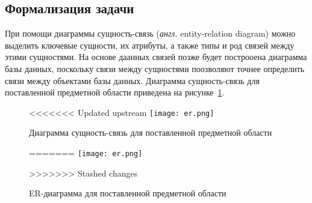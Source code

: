 \subsection{Формализация задачи}

При помощи диаграммы сущность-связь (\textit{англ.} entity-relation diagram) можно выделить ключевые сущности, их атрибуты, а также типы и род связей между этими сущностями.
На основе даанных связей позже будет построоена диаграмма базы данных, поскольку связи между сущностями поозволяют точнее определить связи между объектами базы данных.
Диаграмма сущность-связь для поставленной предметной области приведена на рисунке~\ref{fig:er}.

\begin{figure}[h!]
	\centering
	\captionsetup{justification=centering}
<<<<<<< Updated upstream
	\texttt{[image: er.png]}
	\caption{Диаграмма сущность-связь для поставленной предметной области}
=======
	\texttt{[image: er.png]}
	\caption{ER-диаграмма для поставленной предметной области}
>>>>>>> Stashed changes
	\label{fig:er}
\end{figure}
 
 \clearpage


